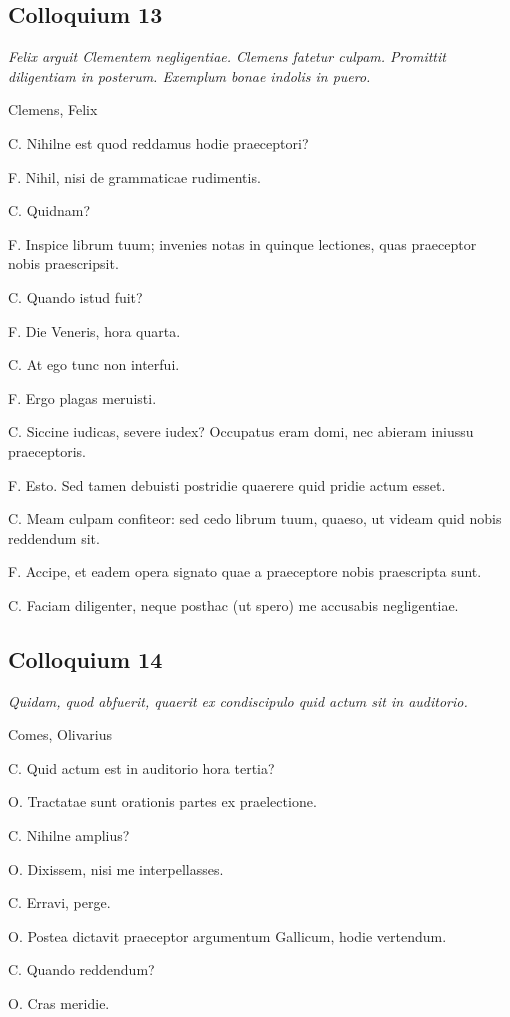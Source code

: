 \documentclass{article}
\begin{document}
\subsection{Colloquium 13}
\emph{Felix arguit Clementem negligentiae. Clemens fatetur culpam. Promittit diligentiam in posterum. Exemplum bonae indolis in puero.}

Clemens, Felix

C. Nihilne est quod reddamus hodie praeceptori?

F. Nihil, nisi de grammaticae rudimentis.

C. Quidnam?

F. Inspice librum tuum; invenies notas in quinque lectiones, quas praeceptor nobis praescripsit.

C. Quando istud fuit?

F. Die Veneris, hora quarta.

C. At ego tunc non interfui.

F. Ergo plagas meruisti.

C. Siccine iudicas, severe iudex? Occupatus eram domi, nec abieram iniussu praeceptoris.

F. Esto. Sed tamen debuisti postridie quaerere quid pridie actum esset.

C. Meam culpam confiteor: sed cedo librum tuum, quaeso, ut videam quid nobis reddendum sit.

F. Accipe, et eadem opera signato quae a praeceptore nobis praescripta sunt.

C. Faciam diligenter, neque posthac (ut spero) me accusabis negligentiae.

\subsection{Colloquium 14}
\emph{Quidam, quod abfuerit, quaerit ex condiscipulo quid actum sit in auditorio.}

Comes, Olivarius

C. Quid actum est in auditorio hora tertia?

O. Tractatae sunt orationis partes ex praelectione.

C. Nihilne amplius?

O. Dixissem, nisi me interpellasses.

C. Erravi, perge.

O. Postea dictavit praeceptor argumentum Gallicum, hodie vertendum.

C. Quando reddendum?

O. Cras meridie.
\end{document}
